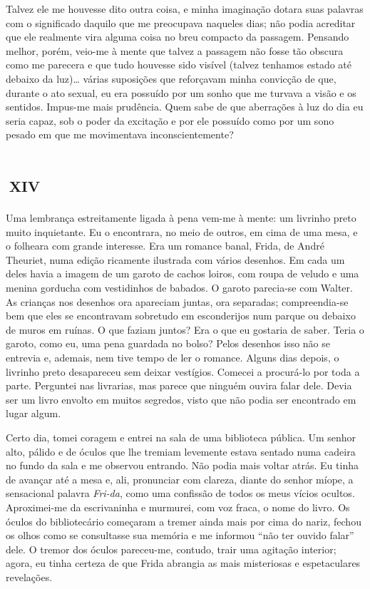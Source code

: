 Talvez ele me houvesse dito outra coisa, e minha imaginação dotara suas palavras com o significado daquilo que me preocupava naqueles dias; não podia acreditar que ele realmente vira alguma coisa no breu compacto da passagem. Pensando melhor, porém, veio-me à mente que talvez a passagem não fosse tão obscura como me parecera e que tudo houvesse sido visível (talvez tenhamos estado até debaixo da luz)\ldots{} várias suposições que reforçavam minha convicção de que, durante o ato sexual, eu era possuído por um sonho que me turvava a visão e os sentidos. Impus-me mais prudência. Quem sabe de que aberrações à luz do dia eu seria capaz, sob o poder da excitação e por ele possuído como por um sono pesado em que me movimentava inconscientemente?


\chapter*{\small{}\,\Large\centering\textsc{xiv}\,\small{}}

Uma lembrança estreitamente ligada à pena vem-me à mente: um livrinho preto muito inquietante. Eu o encontrara, no meio de outros, em cima de uma mesa, e o folheara com grande interesse. Era um romance banal, Frida, de André Theuriet, numa edição ricamente ilustrada com vários desenhos. Em cada um deles havia a imagem de um garoto de cachos loiros, com roupa de veludo e uma menina gorducha com vestidinhos de babados. O garoto parecia-se com Walter. As crianças nos desenhos ora apareciam juntas, ora separadas; compreendia-se bem que eles se encontravam sobretudo em esconderijos num parque ou debaixo de muros em ruínas. O que faziam juntos? Era o que eu gostaria de saber. Teria o garoto, como eu, uma pena guardada no bolso? Pelos desenhos isso não se entrevia e, ademais, nem tive tempo de ler o romance. Alguns dias depois, o livrinho preto desapareceu sem deixar vestígios. Comecei a procurá-lo por toda a parte. Perguntei nas livrarias, mas parece que ninguém ouvira falar dele. Devia ser um livro envolto em muitos segredos, visto que não podia ser encontrado em lugar algum.

Certo dia, tomei coragem e entrei na sala de uma biblioteca pública. Um senhor alto, pálido e de óculos que lhe tremiam levemente estava sentado numa cadeira no fundo da sala e me observou entrando. Não podia mais voltar atrás. Eu tinha de avançar até a mesa e, ali, pronunciar com clareza, diante do senhor míope, a sensacional palavra \textit{Fri-da}, como uma confissão de todos os meus vícios ocultos. Aproximei-me da escrivaninha e murmurei, com voz fraca, o nome do livro. Os óculos do bibliotecário começaram a tremer ainda mais por cima do nariz, fechou os olhos como se consultasse sua memória e me informou ``não ter ouvido falar'' dele. O tremor dos óculos pareceu-me, contudo, trair uma agitação interior; agora, eu tinha certeza de que Frida abrangia as mais misteriosas e espetaculares revelações.

